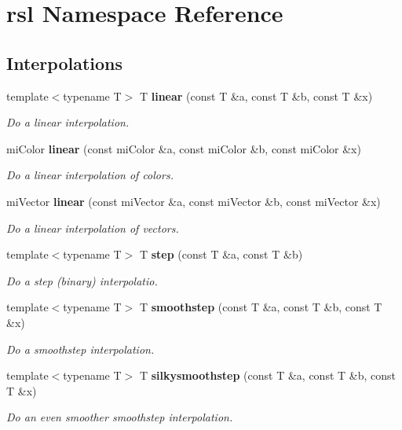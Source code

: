 \section{rsl Namespace Reference}
\label{namespacersl}


\subsection*{Interpolations}
\begin{CompactItemize}
\item 
template$<$typename T$>$ T {\bf linear} (const T \&a, const T \&b, const T \&x)
\begin{CompactList}\small\item\em Do a linear interpolation. \item\end{CompactList}\item 
mi\-Color {\bf linear} (const mi\-Color \&a, const mi\-Color \&b, const mi\-Color \&x)
\begin{CompactList}\small\item\em Do a linear interpolation of colors. \item\end{CompactList}\item 
mi\-Vector {\bf linear} (const mi\-Vector \&a, const mi\-Vector \&b, const mi\-Vector \&x)
\begin{CompactList}\small\item\em Do a linear interpolation of vectors. \item\end{CompactList}\item 
template$<$typename T$>$ T {\bf step} (const T \&a, const T \&b)
\begin{CompactList}\small\item\em Do a step (binary) interpolatio. \item\end{CompactList}\item 
template$<$typename T$>$ T {\bf smoothstep} (const T \&a, const T \&b, const T \&x)
\begin{CompactList}\small\item\em Do a smoothstep interpolation. \item\end{CompactList}\item 
template$<$typename T$>$ T {\bf silkysmoothstep} (const T \&a, const T \&b, const T \&x)
\begin{CompactList}\small\item\em Do an even smoother smoothstep interpolation. \item\end{CompactList}\item 

\end{CompactItemize}
